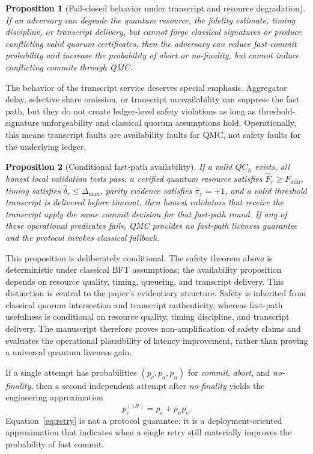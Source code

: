 \documentclass{ieeeaccess}
\newtheorem{proposition}{Proposition}
\begin{document}
\begin{proposition}[Fail-closed behavior under transcript and resource degradation]
If an adversary can degrade the quantum resource, the fidelity estimate, timing discipline, or transcript delivery, but cannot forge classical signatures or produce conflicting valid quorum certificates, then the adversary can reduce fast-commit probability and increase the probability of \textit{abort} or \textit{no-finality}, but cannot induce conflicting commits through QMC.
\end{proposition}

The behavior of the transcript service deserves special emphasis. Aggregator delay, selective share omission, or transcript unavailability can suppress the fast path, but they do not create ledger-level safety violations as long as threshold-signature unforgeability and classical quorum assumptions hold. Operationally, this means transcript faults are availability faults for QMC, not safety faults for the underlying ledger.

\begin{proposition}[Conditional fast-path availability]
If a valid $QC_h$ exists, all honest local validation tests pass, a verified quantum resource satisfies $\widehat{F}_r\geq F_{\min}$, timing satisfies $\widehat{\delta}_r\leq\Delta_{\max}$, parity evidence satisfies $\widehat{\pi}_r=+1$, and a valid threshold transcript is delivered before timeout, then honest validators that receive the transcript apply the same \textit{commit} decision for that fast-path round. If any of these operational predicates fails, QMC provides no fast-path liveness guarantee and the protocol invokes classical fallback.
\end{proposition}

This proposition is deliberately conditional. The safety theorem above is deterministic under classical BFT assumptions; the availability proposition depends on resource quality, timing, queueing, and transcript delivery. This distinction is central to the paper's evidentiary structure. Safety is inherited from classical quorum intersection and transcript authenticity, whereas fast-path usefulness is conditional on resource quality, timing discipline, and transcript delivery. The manuscript therefore proves non-amplification of safety claims and evaluates the operational plausibility of latency improvement, rather than proving a universal quantum liveness gain.

If a single attempt has probabilities $(p_c,p_a,p_n)$ for \textit{commit}, \textit{abort}, and \textit{no-finality}, then a second independent attempt after \textit{no-finality} yields the engineering approximation
\begin{equation}
p_c^{(1R)} = p_c + p_n p_c.
\label{eq:retry}
\end{equation}
Equation~\eqref{eq:retry} is not a protocol guarantee; it is a deployment-oriented approximation that indicates when a single retry still materially improves the probability of fast commit.
\end{document}
